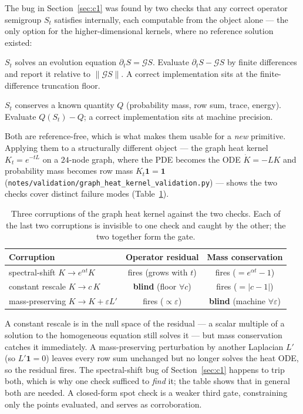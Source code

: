 \documentclass{article}
\newcommand{\code}[1]{\texttt{#1}}
\begin{document}
The bug in Section~\ref{sec:c1} was found by two checks that any correct
operator semigroup $S_t$ satisfies internally, each computable from the
object alone --- the only option for the higher-dimensional kernels,
where no reference solution existed:
\begin{description}\itemsep2pt
  \item[Operator-equation residual.] $S_t$ solves an evolution equation
  $\partial_t S = \mathcal{G} S$. Evaluate $\partial_t S - \mathcal{G} S$
  by finite differences and report it relative to $\lVert \mathcal{G}S\rVert$.
  A correct implementation sits at the finite-difference truncation
  floor.
  \item[Conserved-quantity check.] $S_t$ conserves a known quantity $Q$
  (probability mass, row sum, trace, energy). Evaluate $Q(S_t) - Q$;
  a correct implementation sits at machine precision.
\end{description}
Both are reference-free, which is what makes them usable for a
\emph{new} primitive. Applying them to a structurally different object
--- the graph heat kernel $K_t = e^{-tL}$ on a $24$-node graph, where the
PDE becomes the ODE $\dot K = -LK$ and probability mass becomes row mass
$K_t \mathbf{1} = \mathbf{1}$ (\code{notes/validation/graph\_heat\_kernel\_validation.py})
--- shows the two checks cover distinct failure modes
(Table~\ref{tab:dualcheck}).

\begin{table}[t]
  \centering
  \caption{Three corruptions of the graph heat kernel against the two
  checks. Each of the last two corruptions is invisible to one check and
  caught by the other; the two together form the gate.}
  \label{tab:dualcheck}
  \begin{tabular}{lcc}
    \toprule
    Corruption & Operator residual & Mass conservation \\
    \midrule
    spectral-shift $K \to e^{\alpha t} K$ & fires (grows with $t$) & fires ($=e^{\alpha t}-1$) \\
    constant rescale $K \to c\,K$         & \textbf{blind} (floor $\forall c$) & fires ($=|c-1|$) \\
    mass-preserving $K \to K + \varepsilon L'$ & fires ($\propto \varepsilon$) & \textbf{blind} (machine $\forall \varepsilon$) \\
    \bottomrule
  \end{tabular}
\end{table}

A constant rescale is in the null space of the residual --- a scalar
multiple of a solution to the homogeneous equation still solves it ---
but mass conservation catches it immediately. A mass-preserving
perturbation by another Laplacian $L'$ (so $L'\mathbf{1}=0$) leaves every
row sum unchanged but no longer solves the heat ODE, so the residual
fires. The spectral-shift bug of Section~\ref{sec:c1} happens to trip
both, which is why one check sufficed to \emph{find} it; the table shows
that in general both are needed. A closed-form spot check is a weaker
third gate, constraining only the points evaluated, and serves as
corroboration.
\end{document}
